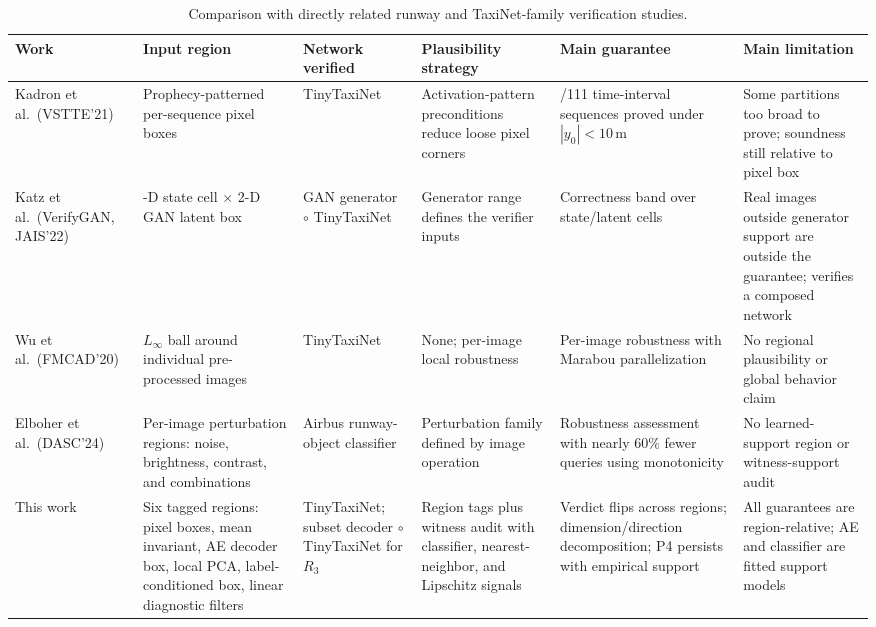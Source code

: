 \documentclass[twocolumn,smallextended,runningheads]{svjour3}
\newcommand{\sttttablefont}{\footnotesize}
\begin{document}
\begin{table}[t]
\centering
\sttttablefont
\setlength{\tabcolsep}{4pt}
\begin{tabular}{>{\raggedright\arraybackslash}p{1.9cm}>{\raggedright\arraybackslash}p{2.3cm}>{\raggedright\arraybackslash}p{2.0cm}>{\raggedright\arraybackslash}p{2.6cm}>{\raggedright\arraybackslash}p{2.3cm}>{\raggedright\arraybackslash}p{2.3cm}}
\toprule
Work & Input region & Network verified & Plausibility strategy & Main guarantee & Main limitation \\
\midrule
Kadron et al.\ (VSTTE'21) & Prophecy-patterned per-sequence pixel boxes & TinyTaxiNet & Activation-pattern preconditions reduce loose pixel corners & 33/111 time-interval sequences proved under $|y_0|<10$\,m & Some partitions too broad to prove; soundness still relative to pixel box \\
Katz et al.\ (VerifyGAN, JAIS'22) & 2-D state cell $\times$ 2-D GAN latent box & GAN generator $\circ$ TinyTaxiNet & Generator range defines the verifier inputs & Correctness band over state/latent cells & Real images outside generator support are outside the guarantee; verifies a composed network \\
Wu et al.\ (FMCAD'20) & $L_\infty$ ball around individual pre-processed images & TinyTaxiNet & None; per-image local robustness & Per-image robustness with Marabou parallelization & No regional plausibility or global behavior claim \\
Elboher et al.\ (DASC'24) & Per-image perturbation regions: noise, brightness, contrast, and combinations & Airbus runway-object classifier & Perturbation family defined by image operation & Robustness assessment with nearly 60\% fewer queries using monotonicity & No learned-support region or witness-support audit \\
This work & Six tagged regions: pixel boxes, mean invariant, AE decoder box, local PCA, label-conditioned box, linear diagnostic filters & TinyTaxiNet; subset decoder $\circ$ TinyTaxiNet for $R_3$ & Region tags plus witness audit with classifier, nearest-neighbor, and Lipschitz signals & Verdict flips across regions; dimension/direction decomposition; P4 persists with empirical support & All guarantees are region-relative; AE and classifier are fitted support models \\
\bottomrule
\end{tabular}
\caption{Comparison with directly related runway and TaxiNet-family verification studies.}
\label{tab:prior_work}
\end{table}
\end{document}
